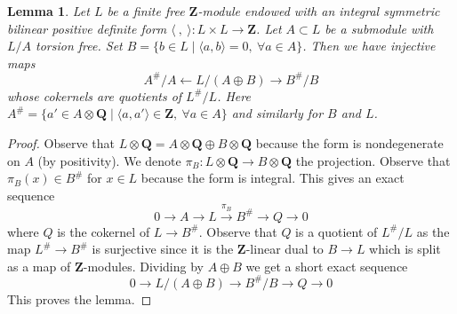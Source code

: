 \documentclass[10pt,a4paper]{amsart}
\theoremstyle{plain}
\newtheorem{lemma}[subsection]{Lemma}
\theoremstyle{definition}
\theoremstyle{remark}
\numberwithin{equation}{subsection}
\begin{document}
\begin{lemma}
\label{lemma-orthogonal-direct-sum}
Let $L$ be a finite free $\mathbf{Z}$-module endowed
with an integral symmetric bilinear positive definite
form $\langle\ ,\ \rangle : L \times L \to \mathbf{Z}$.
Let $A \subset L$ be a submodule with $L/A$ torsion free. Set
$B = \{b \in L \mid \langle a, b\rangle = 0,\ \forall a \in A\}$.
Then we have injective maps
$$
A^\#/A \leftarrow L/(A \oplus B) \rightarrow B^\#/B
$$
whose cokernels are quotients of $L^\#/L$. Here
$A^\# = \{a' \in A \otimes \mathbf{Q} \mid
\langle a, a'\rangle \in \mathbf{Z},\ \forall a \in A\}$
and similarly for $B$ and $L$.
\end{lemma}

\begin{proof}
Observe that
$L \otimes \mathbf{Q} = A \otimes \mathbf{Q} \oplus B \otimes \mathbf{Q}$
because the form is nondegenerate on $A$ (by positivity).
We denote $\pi_B : L \otimes \mathbf{Q} \to B \otimes \mathbf{Q}$
the projection. Observe that $\pi_B(x) \in B^\#$ for $x \in L$
because the form is integral. This gives an exact sequence
$$
0 \to A \to L \xrightarrow{\pi_B} B^\# \to Q \to 0
$$
where $Q$ is the cokernel of $L \to B^\#$. Observe that $Q$
is a quotient of $L^\#/L$ as the map $L^\# \to B^\#$ is surjective
since it is the $\mathbf{Z}$-linear dual to $B \to L$ which is split
as a map of $\mathbf{Z}$-modules.
Dividing by $A \oplus B$ we get a short exact sequence
$$
0 \to L/(A \oplus B) \to B^\#/B \to Q \to 0
$$
This proves the lemma.
\end{proof}
\end{document}
